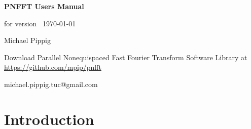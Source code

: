 \documentclass[a4paper,11pt,final,openright,headsepline]{scrreprt}
\numberwithin{figure}{chapter}
\numberwithin{table}{chapter}
\numberwithin{equation}{chapter}
\begin{document}
  \setcounter{equation}{0}

  \begin{titlepage}
    \begin{center}
      \vspace*{3cm}
      {\Huge {\textbf{\textsf{PNFFT Users Manual\\}}}}

      \vspace*{1cm}
      for version \pnfftversion\, \today

      \vspace*{3cm}
      Michael Pippig%

      \vspace*{3cm}
      Download Parallel Nonequispaced Fast Fourier Transform Software Library at \\
      {\large \url{https://github.com/mpip/pnfft}}
    \end{center}
    \vfill
    michael.pippig.tuc@gmail.com
  \end{titlepage}

  \tableofcontents


  \chapter{Introduction}\label{kap:intro}
  

\end{document}
